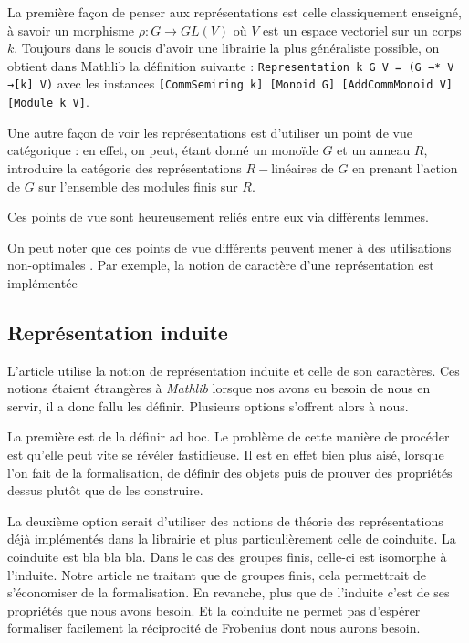 \documentclass[10pt]{article}
\theoremstyle{definition}
\begin{document}
La première façon de penser aux représentations est celle classiquement enseigné, à savoir un morphisme $\rho : G \rightarrow GL(V)$ où $V$ est un espace vectoriel sur un corps $k$. Toujours dans le soucis d'avoir une librairie la plus généraliste possible, on obtient dans Mathlib la définition suivante : \lstinline|Representation k G V = (G →* V →[k] V)| avec les instances \lstinline|[CommSemiring k] [Monoid G] [AddCommMonoid V] [Module k V]|.
\newline

Une autre façon de voir les représentations est d'utiliser un point de vue catégorique : en effet, on peut, étant donné un monoïde $G$ et un anneau $R$, introduire la catégorie des représentations $R-$linéaires de $G$ en prenant l'action de $G$ sur l'ensemble des modules finis sur $R$.
\newline

Ces points de vue sont heureusement reliés entre eux via différents lemmes.

On peut noter que ces points de vue différents peuvent mener à des utilisations \og non-optimales \fg. Par exemple, la notion de caractère d'une représentation est implémentée 


\subsection{Représentation induite}
L'article utilise la notion de représentation induite et celle de son caractères. Ces notions étaient étrangères à \textit{Mathlib} lorsque nos avons eu besoin de nous en servir, il a donc fallu les définir. Plusieurs options s'offrent alors à nous.
\newline

La première est de la définir ad hoc. Le problème de cette manière de procéder est qu'elle peut vite se révéler fastidieuse. Il est en effet bien plus aisé, lorsque l'on fait de la formalisation, de définir des objets puis de prouver des propriétés dessus plutôt que de les construire.
\newline

La deuxième option serait d'utiliser des notions de théorie des représentations déjà implémentés dans la librairie et plus particulièrement celle de coinduite. La coinduite est bla bla bla. Dans le cas des groupes finis, celle-ci est isomorphe à l'induite. Notre article ne traitant que de groupes finis, cela permettrait de s'économiser de la formalisation. En revanche, plus que de l'induite c'est de ses propriétés que nous avons besoin. Et la coinduite ne permet pas d'espérer formaliser facilement la réciprocité de Frobenius dont nous aurons besoin.
\newline
\end{document}
